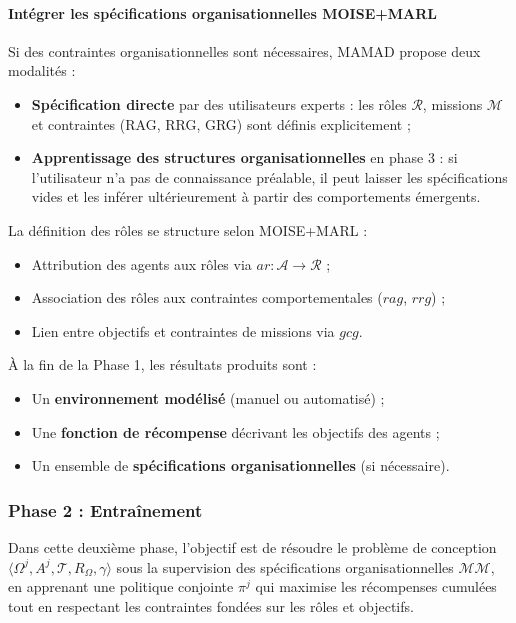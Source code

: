 \paragraph{Intégrer les spécifications organisationnelles MOISE+MARL}

Si des contraintes organisationnelles sont nécessaires, MAMAD propose deux modalités :
\begin{itemize}
    \item \textbf{Spécification directe} par des utilisateurs experts : les rôles $\mathcal{R}$, missions $\mathcal{M}$ et contraintes (RAG, RRG, GRG) sont définis explicitement ;
          
    \item \textbf{Apprentissage des structures organisationnelles} en phase 3 : si l'utilisateur n'a pas de connaissance préalable, il peut laisser les spécifications vides et les inférer ultérieurement à partir des comportements émergents.
\end{itemize}

La définition des rôles se structure selon MOISE+MARL :
\begin{itemize}
    \item Attribution des agents aux rôles via $ar: \mathcal{A} \to \mathcal{R}$ ;
    \item Association des rôles aux contraintes comportementales ($rag$, $rrg$) ;
    \item Lien entre objectifs et contraintes de missions via $gcg$.
\end{itemize}

\vspace{0.4em}
\noindent À la fin de la Phase 1, les résultats produits sont :
\begin{itemize}
    \item Un \textbf{environnement modélisé} (manuel ou automatisé) ;
    \item Une \textbf{fonction de récompense} décrivant les objectifs des agents ;
    \item Un ensemble de \textbf{spécifications organisationnelles} (si nécessaire).
\end{itemize}


\subsubsection{Phase 2 : Entraînement}

Dans cette deuxième phase, l'objectif est de résoudre le problème de conception $\langle \Omega^j, A^j, \mathcal{T}, R_{\Omega}, \gamma \rangle$ sous la supervision des spécifications organisationnelles $\mathcal{MM}$, en apprenant une politique conjointe $\pi^j$ qui maximise les récompenses cumulées tout en respectant les contraintes fondées sur les rôles et objectifs.

